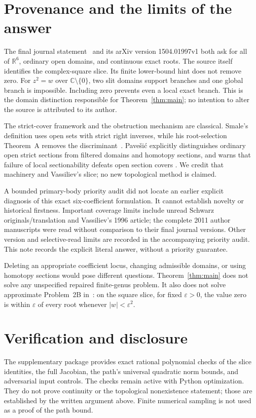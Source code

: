\documentclass[11pt]{article}
\newcommand{\R}{\mathbb R}
\newcommand{\C}{\mathbb C}
\begin{document}
\section{Provenance and the limits of the answer}
The final journal statement~\cite{V15} and its arXiv version
1504.01997v1 both ask for all of \(\R^6\), ordinary open domains, and
continuous exact roots. The source itself identifies the complex-square
slice. Its finite lower-bound hint does not remove zero.
For \(z^2=w\) over \(\C\setminus\{0\}\), two slit domains support branches
and one global branch is impossible. Including zero prevents even a
local exact branch. This is the domain distinction responsible for
Theorem~\ref{thm:main}; no intention to alter the source is attributed
to its author.

The strict-cover framework and the obstruction mechanism are classical.
Smale's definition uses open sets with strict right inverses, while his
root-selection Theorem~A removes the discriminant~\cite[pp.~83--85]{S87}.
Pave\v{s}i\'c explicitly distinguishes ordinary open strict sections
from filtered domains and homotopy sections, and warns that failure of
local sectionability defeats open section covers
\cite[Section~5, pp.~75--76]{P18}\cite[Section~2, pp.~109,111]{P19}.
We credit that machinery and Vassiliev's slice; no new topological
method is claimed.

A bounded primary-body priority audit did not locate an earlier explicit
diagnosis of this exact six-coefficient formulation. It cannot establish
novelty or historical firstness. Important coverage limits include
unread Schwarz originals/translation and Vassiliev's 1996 article;
the complete 2011 author manuscripts were read without comparison
to their final journal versions. Other version and selective-read
limits are recorded in the accompanying priority audit. This note
records the explicit literal answer, without a priority guarantee.

Deleting an appropriate coefficient locus, changing admissible domains,
or using homotopy sections would pose different questions.
Theorem~\ref{thm:main} does not solve any unspecified repaired finite-genus
problem. It also does not solve approximate Problem~2B in~\cite{V15}:
on the square slice, for fixed \(\varepsilon>0\), the value zero is
within \(\varepsilon\) of every root whenever \(|w|<\varepsilon^2\).

\section*{Verification and disclosure}
The supplementary package provides exact rational polynomial checks
of the slice identities, the full Jacobian, the path's universal
quadratic norm bounds, and adversarial input controls. The checks
remain active with Python optimization. They do not prove continuity
or the topological nonexistence statement; those are established by
the written argument above. Finite numerical sampling is not used
as a proof of the path bound.
\end{document}
